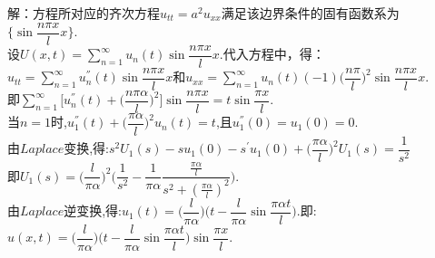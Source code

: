 \documentclass[11pt]{article}
\begin{document}
\begin{enumerate}
        解：方程所对应的齐次方程$u_{tt}=a^{2}u_{xx}$满足该边界条件的固有函数系为$\{\sin \dfrac{n\pi x}{l} x\}$.\\设$U(x,t)=\sum\limits_{n=1}^{\infty}u_n(t)\sin \dfrac{n\pi x}{l} x$.代入方程中，得：\\$u_{tt}=\sum\limits_{n=1}^{\infty}u_{n}^{''}(t)\sin \dfrac{n\pi x}{l} x$和$u_{xx}=\sum\limits_{n=1}^{\infty}u_{n}(t)(-1)\big(\dfrac{n\pi}{l}\big)^2\sin \dfrac{n\pi x}{l} x$.\\即$\sum\limits_{n=1}^{\infty}\big[u_{n}^{''}(t)+\big(\dfrac{n\pi \alpha}{l}\big)^2\big]\sin\dfrac{n\pi x}{l}=t\sin\dfrac{\pi x}{l}$.\\当$n=1$时,$u_{1}^{''}(t)+\big(\dfrac{\pi \alpha}{l}\big)^{2}u_n(t)=t$,且$u_{1}^{''}(0)=u_{1}(0)=0$.\\由$Laplace$变换,得:$s^{2}U_{1}(s)-su_{1}(0)-s^{'}u_{1}(0)+\big(\dfrac{\pi\alpha}{l}\big)^{2}U_{1}(s)=\dfrac{1}{s^2}$\\即$U_{1}(s)=\big(\dfrac{l}{\pi\alpha}\big)^{2}\bigg(\dfrac{1}{s^2}-\dfrac{1}{\pi\alpha}\dfrac{\frac{\pi\alpha}{l}}{s^2+(\frac{\pi\alpha}{l})^2}\bigg)$.\\由$Laplace$逆变换,得:$u_{1}(t)=\big(\dfrac{l}{\pi\alpha}\big)\big(t-\dfrac{l}{\pi\alpha}\sin\dfrac{\pi\alpha t}{l}\big)$.即:$u(x,t)=\big(\dfrac{l}{\pi\alpha}\big)\big(t-\dfrac{l}{\pi\alpha}\sin\dfrac{\pi\alpha t}{l}\big)\sin\dfrac{\pi x}{l}$.


    \end{enumerate}
\end{document}
